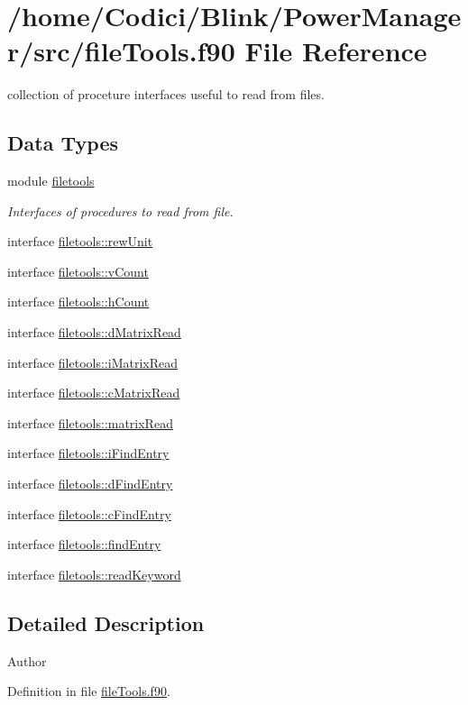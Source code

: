 \hypertarget{file_tools_8f90}{\section{/home/\-Codici/\-Blink/\-Power\-Manager/src/file\-Tools.f90 File Reference}
\label{file_tools_8f90}
}


collection of proceture interfaces useful to read from files.  


\subsection*{Data Types}
\begin{DoxyCompactItemize}
\item 
module \hyperlink{classfiletools}{filetools}
\begin{DoxyCompactList}\small\item\em Interfaces of procedures to read from file. \end{DoxyCompactList}\item 
interface \hyperlink{interfacefiletools_1_1rew_unit}{filetools\-::rew\-Unit}
\item 
interface \hyperlink{interfacefiletools_1_1v_count}{filetools\-::v\-Count}
\item 
interface \hyperlink{interfacefiletools_1_1h_count}{filetools\-::h\-Count}
\item 
interface \hyperlink{interfacefiletools_1_1d_matrix_read}{filetools\-::d\-Matrix\-Read}
\item 
interface \hyperlink{interfacefiletools_1_1i_matrix_read}{filetools\-::i\-Matrix\-Read}
\item 
interface \hyperlink{interfacefiletools_1_1c_matrix_read}{filetools\-::c\-Matrix\-Read}
\item 
interface \hyperlink{interfacefiletools_1_1matrix_read}{filetools\-::matrix\-Read}
\item 
interface \hyperlink{interfacefiletools_1_1i_find_entry}{filetools\-::i\-Find\-Entry}
\item 
interface \hyperlink{interfacefiletools_1_1d_find_entry}{filetools\-::d\-Find\-Entry}
\item 
interface \hyperlink{interfacefiletools_1_1c_find_entry}{filetools\-::c\-Find\-Entry}
\item 
interface \hyperlink{interfacefiletools_1_1find_entry}{filetools\-::find\-Entry}
\item 
interface \hyperlink{interfacefiletools_1_1read_keyword}{filetools\-::read\-Keyword}
\end{DoxyCompactItemize}


\subsection{Detailed Description}
\begin{DoxyAuthor}{Author}

\end{DoxyAuthor}


Definition in file \hyperlink{file_tools_8f90_source}{file\-Tools.\-f90}.

